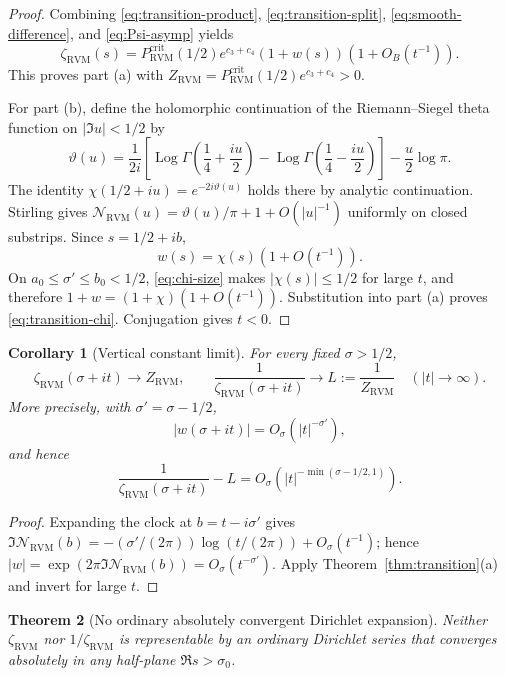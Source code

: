 \documentclass[11pt,reqno]{amsart}
\newtheorem{theorem}{Theorem}[section]
\newtheorem{corollary}[theorem]{Corollary}
\theoremstyle{definition}
\theoremstyle{remark}
\newcommand{\Log}{\operatorname{Log}}
\newcommand{\RVM}{\mathrm{RVM}}
\newcommand{\crit}{\mathrm{crit}}
\begin{document}
\begin{proof}
Combining \eqref{eq:transition-product}, \eqref{eq:transition-split},
\eqref{eq:smooth-difference}, and \eqref{eq:Psi-asymp} yields
\[
 \zeta_{\RVM}(s)
 =P_{\RVM}^{\crit}(1/2)e^{c_3+c_4}(1+w(s))(1+O_B(t^{-1})).
\]
This proves part (a) with
$Z_{\RVM}=P_{\RVM}^{\crit}(1/2)e^{c_3+c_4}>0$.

For part (b), define the holomorphic continuation of the Riemann--Siegel theta function on $|\Im u|<1/2$ by
\[
 \vartheta(u)=\frac1{2i}\left[\Log\Gamma\left(\frac14+\frac{iu}{2}\right)-
 \Log\Gamma\left(\frac14-\frac{iu}{2}\right)\right]-\frac u2\log\pi.
\]
The identity $\chi(1/2+iu)=e^{-2i\vartheta(u)}$ holds there by analytic continuation.  Stirling gives
$\mathcal N_{\RVM}(u)=\vartheta(u)/\pi+1+O(|u|^{-1})$ uniformly on closed substrips.  Since $s=1/2+ib$,
\[
 w(s)=\chi(s)(1+O(t^{-1})).
\]
On $a_0\le\sigma'\le b_0<1/2$, \eqref{eq:chi-size} makes $|\chi(s)|\le1/2$ for large $t$, and therefore
$1+w=(1+\chi)(1+O(t^{-1}))$.  Substitution into part (a) proves \eqref{eq:transition-chi}.  Conjugation gives $t<0$.
\end{proof}

\begin{corollary}[Vertical constant limit]\label{cor:vertical-limit}
For every fixed $\sigma>1/2$,
\begin{equation}\label{eq:vertical-limit}
 \zeta_{\RVM}(\sigma+it)\longrightarrow Z_{\RVM},\qquad
 \frac1{\zeta_{\RVM}(\sigma+it)}\longrightarrow L:=\frac1{Z_{\RVM}}
 \quad(|t|\to\infty).
\end{equation}
More precisely, with $\sigma'=\sigma-1/2$,
\begin{equation}\label{eq:w-decay}
 |w(\sigma+it)|=O_\sigma(|t|^{-\sigma'}),
\end{equation}
and hence
\begin{equation}\label{eq:FminusL-all}
 \frac1{\zeta_{\RVM}(\sigma+it)}-L
 =O_\sigma(|t|^{-\min(\sigma-1/2,1)}).
\end{equation}
\end{corollary}

\begin{proof}
Expanding the clock at $b=t-i\sigma'$ gives
$\Im\mathcal N_{\RVM}(b)=-(\sigma'/(2\pi))\log(t/(2\pi))+O_\sigma(t^{-1})$; hence
$|w|=\exp(2\pi\Im\mathcal N_{\RVM}(b))=O_\sigma(t^{-\sigma'})$.
Apply Theorem~\ref{thm:transition}(a) and invert for large $t$.
\end{proof}

\begin{theorem}[No ordinary absolutely convergent Dirichlet expansion]\label{thm:no-Dirichlet-RVM}
Neither $\zeta_{\RVM}$ nor $1/\zeta_{\RVM}$ is representable by an ordinary Dirichlet series that converges absolutely in any half-plane $\Re s>\sigma_0$.
\end{theorem}
\end{document}
